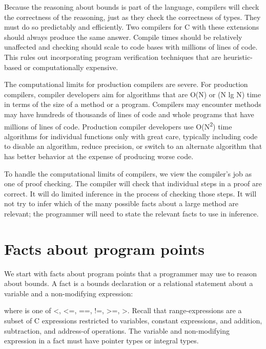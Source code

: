 Because the reasoning about bounds is part of the language, compilers
will check the correctness of the reasoning, just as they check the
correctness of types. They must do so predictably and efficiently. Two
compilers for C with these extensions should always produce the same
answer. Compile times should be relatively unaffected and checking
should scale to code bases with millions of lines of code. This rules
out incorporating program verification techniques that are
heuristic-based or computationally expensive.

The computational limits for production compilers are severe. For
production compilers, compiler developers aim for algorithms that are
O(N) or (N lg N) time in terms of the size of a method or a program.
Compilers may encounter methods may have hundreds of thousands of lines
of code and whole programs that have millions of lines of code.
Production compiler developers use O(N\textsuperscript{2}) time
algorithms for individual functions only with great care, typically
including code to disable an algorithm, reduce precision, or switch to
an alternate algorithm that has better behavior at the expense of
producing worse code.

To handle the computational limits of compilers, we view the compiler's
job as one of proof checking. The compiler will check that individual
steps in a proof are correct. It will do limited inference in the
process of checking those steps. It will not try to infer which of the
many possible facts about a large method are relevant; the programmer
will need to state the relevant facts to use in inference.

\section{Facts about program points}

We start with facts about program points that a programmer may use to
reason about bounds. A fact is a bounds declaration or a relational
statement about a variable and a non-modifying expression:


\begin{quote}


\end{quote}

where  is one of \textless{}, \textless{}=, ==, !=,
\textgreater{}=, \textgreater{}. Recall that range-expressions are a
subset of C expressions restricted to variables, constant expressions,
and addition, subtraction, and address-of operations. The variable and
non-modifying expression in a fact must have pointer types or integral
types.


